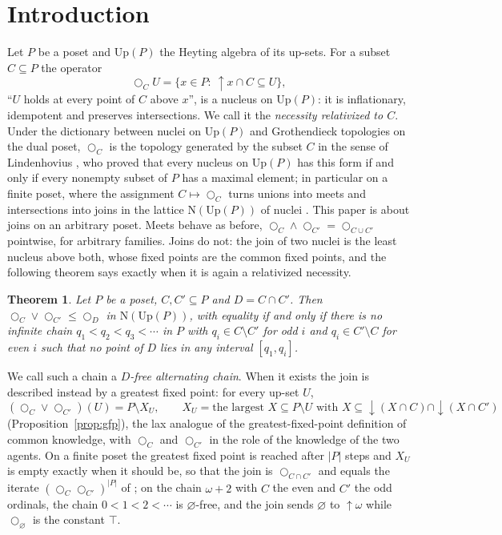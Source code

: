 \documentclass[11pt]{amsart}
\newtheorem{thm}{Theorem}[section]
\theoremstyle{definition}
\newcommand{\Up}{\mathrm{Up}}
\newcommand{\Nuc}{\mathrm{N}}
\newcommand{\lax}{\bigcirc}
\newcommand{\dn}{{\downarrow}}
\newcommand{\upa}{{\uparrow}}
\begin{document}
\section{Introduction}

Let $P$ be a poset and $\Up(P)$ the Heyting algebra of its up-sets. For a
subset $C\subseteq P$ the operator
\[
\lax_CU=\{x\in P:\ \upa x\cap C\subseteq U\},
\]
``$U$ holds at every point of $C$ above $x$'', is a nucleus on $\Up(P)$: it is
inflationary, idempotent and preserves intersections. We call it the
\emph{necessity relativized to $C$}. Under the dictionary between nuclei on
$\Up(P)$ and Grothendieck topologies on the dual poset, $\lax_C$ is the
topology generated by the subset $C$ in the sense of Lindenhovius
\cite{Lindenhovius}, who proved that every nucleus on $\Up(P)$ has this form
if and only if every nonempty subset of $P$ has a maximal element; in
particular on a finite poset, where the assignment $C\mapsto\lax_C$ turns
unions into meets and intersections into joins in the lattice
$\Nuc(\Up(P))$ of nuclei \cite[Thm.~4.1]{Laxjoin}. This paper is about
joins on an arbitrary poset. Meets
behave as before, $\lax_C\wedge\lax_{C'}=\lax_{C\cup C'}$ pointwise, for
arbitrary families. Joins do not: the join of two nuclei is the least nucleus
above both, whose fixed points are the common fixed points, and the following
theorem says exactly when it is again a relativized necessity.

\begin{thm}\label{thm:main}
Let $P$ be a poset, $C,C'\subseteq P$ and $D=C\cap C'$. Then
$\lax_C\vee\lax_{C'}\le\lax_D$ in $\Nuc(\Up(P))$, with equality if and only if
there is no infinite chain $q_1<q_2<q_3<\cdots$ in $P$ with $q_i\in C\setminus C'$
for odd $i$ and $q_i\in C'\setminus C$ for even $i$ such that no point of $D$
lies in any interval $[q_1,q_i]$.
\end{thm}

We call such a chain a \emph{$D$-free alternating chain}. When it exists the
join is described instead by a greatest fixed point: for every up-set $U$,
\[
(\lax_C\vee\lax_{C'})(U)=P\setminus X_U,\qquad
X_U=\text{the largest }X\subseteq P\setminus U\text{ with }
X\subseteq\dn(X\cap C)\cap\dn(X\cap C')
\]
(Proposition~\ref{prop:gfp}), the lax analogue of the greatest-fixed-point
definition of common knowledge, with $\lax_C$ and $\lax_{C'}$ in the role of
the knowledge of the two agents. On a finite poset the greatest fixed point
is reached after $|P|$ steps and $X_U$ is empty exactly when it should be, so
that the join is $\lax_{C\cap C'}$ and equals the iterate
$(\lax_C\lax_{C'})^{|P|}$ of \cite{Laxjoin}; on the chain $\omega+2$ with
$C$ the even and $C'$ the odd ordinals, the chain $0<1<2<\cdots$ is
$\varnothing$-free, and the join sends $\varnothing$ to $\upa\omega$ while
$\lax_\varnothing$ is the constant $\top$.
\end{document}

